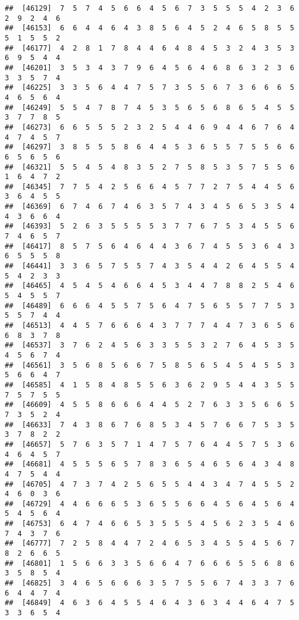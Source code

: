 \documentclass[
]{book}
\begin{document}
\begin{verbatim}
##  [46129]  7  5  7  4  5  6  6  4  5  6  7  3  5  5  5  4  2  3  6  2  9  2  4  6
##  [46153]  6  6  4  4  6  4  3  8  5  6  4  5  2  4  6  5  8  5  5  5  1  5  5  2
##  [46177]  4  2  8  1  7  8  4  4  6  4  8  4  5  3  2  4  3  5  3  6  9  5  4  4
##  [46201]  3  5  3  4  3  7  9  6  4  5  6  4  6  8  6  3  2  3  6  3  3  5  7  4
##  [46225]  3  3  5  6  4  4  7  5  7  3  5  5  6  7  3  6  6  6  5  4  6  5  6  4
##  [46249]  5  5  4  7  8  7  4  5  3  5  6  5  6  8  6  5  4  5  5  3  7  7  8  5
##  [46273]  6  6  5  5  5  2  3  2  5  4  4  6  9  4  4  6  7  6  4  4  7  4  5  7
##  [46297]  3  8  5  5  5  8  6  4  4  5  3  6  5  5  7  5  5  6  6  6  5  6  5  6
##  [46321]  5  5  4  5  4  8  3  5  2  7  5  8  5  3  5  7  5  5  6  1  6  4  7  2
##  [46345]  7  7  5  4  2  5  6  6  4  5  7  7  2  7  5  4  4  5  6  3  6  4  5  5
##  [46369]  6  7  4  6  7  4  6  3  5  7  4  3  4  5  6  5  3  5  4  4  3  6  6  4
##  [46393]  5  2  6  3  5  5  5  5  3  7  7  6  7  5  3  4  5  5  6  7  4  6  5  7
##  [46417]  8  5  7  5  6  4  6  4  4  3  6  7  4  5  5  3  6  4  3  6  5  5  5  8
##  [46441]  3  3  6  5  7  5  5  7  4  3  5  4  4  2  6  4  5  5  4  5  4  2  3  3
##  [46465]  4  5  4  5  4  6  6  4  5  3  4  4  7  8  8  2  5  4  6  5  4  5  5  7
##  [46489]  6  6  6  4  5  5  7  5  6  4  7  5  6  5  5  7  7  5  3  5  5  7  4  4
##  [46513]  4  4  5  7  6  6  6  4  3  7  7  7  4  4  7  3  6  5  6  6  8  3  7  8
##  [46537]  3  7  6  2  4  5  6  3  3  5  5  3  2  7  6  4  5  3  5  4  5  6  7  4
##  [46561]  3  5  6  8  5  6  6  7  5  8  5  6  5  4  5  4  5  5  3  5  6  6  4  7
##  [46585]  4  1  5  8  4  8  5  5  6  3  6  2  9  5  4  4  3  5  5  7  5  7  5  5
##  [46609]  4  5  5  8  6  6  6  4  4  5  2  7  6  3  3  5  6  6  5  7  3  5  2  4
##  [46633]  7  4  3  8  6  7  6  8  5  3  4  5  7  6  6  7  5  3  5  3  7  8  2  2
##  [46657]  5  7  6  3  5  7  1  4  7  5  7  6  4  4  5  7  5  3  6  4  6  4  5  7
##  [46681]  4  5  5  5  6  5  7  8  3  6  5  4  6  5  6  4  3  4  8  4  7  5  4  4
##  [46705]  4  7  3  7  4  2  5  6  5  5  4  4  3  4  7  4  5  5  2  4  6  0  3  6
##  [46729]  4  4  6  6  6  5  3  6  5  5  6  6  4  5  6  4  5  6  4  5  4  5  6  4
##  [46753]  6  4  7  4  6  6  5  3  5  5  5  4  5  6  2  3  5  4  6  7  4  3  7  6
##  [46777]  7  2  5  8  4  4  7  2  4  6  5  3  4  5  5  4  5  6  7  8  2  6  6  5
##  [46801]  1  5  6  6  3  3  5  6  6  4  7  6  6  6  5  5  6  8  6  3  5  8  5  4
##  [46825]  3  4  6  5  6  6  6  3  5  7  5  5  6  7  4  3  3  7  6  6  4  4  7  4
##  [46849]  4  6  3  6  4  5  5  4  6  4  3  6  3  4  4  6  4  7  5  3  3  6  5  4

\end{verbatim}
\end{document}
